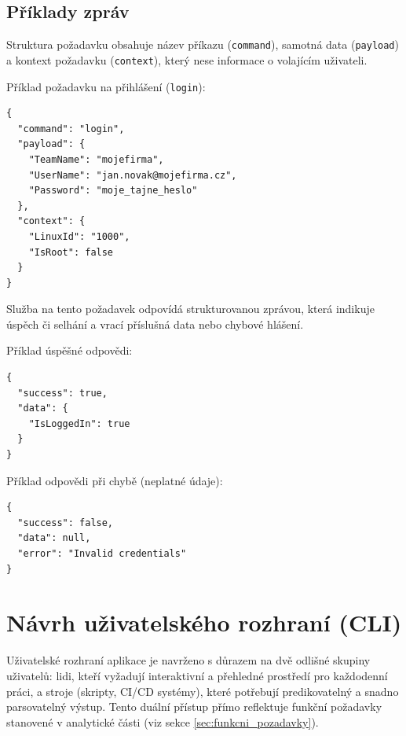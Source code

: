\subsection{Příklady zpráv}
Struktura požadavku obsahuje název příkazu (\texttt{command}), samotná data (\texttt{payload}) a kontext požadavku (\texttt{context}), který nese informace o volajícím uživateli.

Příklad požadavku na přihlášení (\texttt{login}):

\begin{minipage}{\linewidth}
\begin{lstlisting}[language={}]
{
  "command": "login",
  "payload": {
    "TeamName": "mojefirma",
    "UserName": "jan.novak@mojefirma.cz",
    "Password": "moje_tajne_heslo"
  },
  "context": {
    "LinuxId": "1000",
    "IsRoot": false
  }
}
\end{lstlisting}
\end{minipage}

Služba na tento požadavek odpovídá strukturovanou zprávou, která indikuje úspěch či selhání a vrací příslušná data nebo chybové hlášení.

Příklad úspěšné odpovědi:

\begin{minipage}{\linewidth}
\begin{lstlisting}[language={}]
{
  "success": true,
  "data": {
    "IsLoggedIn": true
  }
}
\end{lstlisting}
\end{minipage}

Příklad odpovědi při chybě (neplatné údaje):

\begin{minipage}{\linewidth}
\begin{lstlisting}[language={}]
{
  "success": false,
  "data": null,
  "error": "Invalid credentials"
}
\end{lstlisting}
\end{minipage}

\section{Návrh uživatelského rozhraní (CLI)}
Uživatelské rozhraní aplikace je navrženo s důrazem na dvě odlišné skupiny uživatelů: lidi, kteří vyžadují interaktivní a přehledné prostředí pro každodenní práci, a stroje (skripty, CI/CD systémy), které potřebují predikovatelný a snadno parsovatelný výstup. Tento duální přístup přímo reflektuje funkční požadavky stanovené v analytické části (viz sekce \ref{sec:funkcni_pozadavky}).

